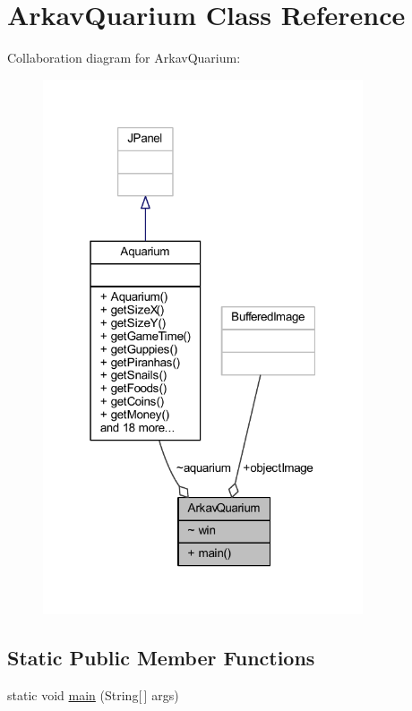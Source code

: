 \hypertarget{class_arkav_quarium}{}\section{Arkav\+Quarium Class Reference}
\label{class_arkav_quarium}


Collaboration diagram for Arkav\+Quarium\+:
\nopagebreak
\begin{figure}[H]
\begin{center}
\leavevmode
\includegraphics[width=268pt]{class_arkav_quarium__coll__graph}
\end{center}
\end{figure}
\subsection*{Static Public Member Functions}
\begin{DoxyCompactItemize}
\item 
static void \mbox{\hyperlink{class_arkav_quarium_acac6b4c3ee0d206eb3fe18e279542d54}{main}} (String\mbox{[}$\,$\mbox{]} args)
\end{DoxyCompactItemize}
